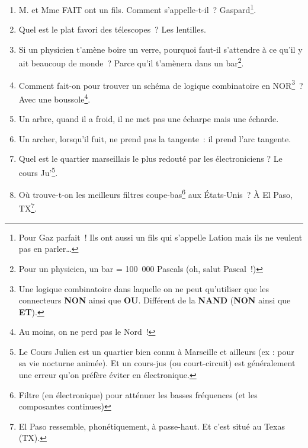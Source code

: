 \documentclass[10pt,a5paper,fullpage]{book}
\begin{document}
\begin{enumerate}
		\textit{\underline{Variante}~: Une prise électrique rend droit comme un} I.\footnote{Le courant est souvent noté I (pour l'intensité) et se mesure en Ampères.} 
		\item M. et Mme FAIT ont un fils. Comment s’appelle-t-il~? Gaspard\footnote{Pour Gaz parfait~! Ils ont aussi un fils qui s’appelle Lation mais ils ne veulent pas en parler\ldots}.
		\item Quel est le plat favori des télescopes~? Les lentilles.
		\item Si un physicien t’amène boire un verre, pourquoi faut-il s’attendre à ce qu’il y ait beaucoup de monde~? Parce qu’il t’amènera dans un bar\footnote{Pour un physicien, un bar = 100 000 Pascals (oh, salut Pascal~!)}.
		\item Comment fait-on pour trouver un schéma de logique combinatoire en NOR\footnote{Une logique combinatoire dans laquelle on ne peut qu’utiliser que les connecteurs \textbf{NON} ainsi que \textbf{OU}. Différent de la \textbf{NAND} (\textbf{NON} ainsi que \textbf{ET}).}~? Avec une boussole\footnote{Au moins, on ne perd pas le Nord~!}.
		\item Un arbre, quand il a froid, il ne met pas une écharpe mais une écharde.
		\item Un archer, lorsqu’il fuit, ne prend pas la tangente~: il prend l’arc tangente.
		\item Quel est le quartier marseillais le plus redouté par les électroniciens ? Le cours Ju'\footnote{Le Cours Julien est un quartier bien connu à Marseille et ailleurs (ex : pour sa vie nocturne animée). Et un cours-jus (ou court-circuit) est généralement une erreur qu'on préfère éviter en électronique.}.
 		\item Où trouve-t-on les meilleurs filtres coupe-bas\footnote{Filtre (en électronique) pour atténuer les basses fréquences (et les composantes continues)} aux États-Unis~? À El Paso, TX\footnote{El Paso ressemble, phonétiquement, à passe-haut. Et c'est situé au Texas (TX).}. 
	\end{enumerate}
	
\end{document}
